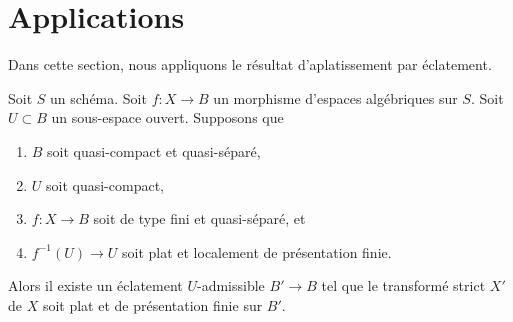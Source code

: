 \section{Applications}
\label{section-applications-flattening-by-blowing-up}

\noindent
Dans cette section, nous appliquons le résultat d'aplatissement par éclatement.

\begin{lemma}
\label{lemma-flat-after-blowing-up}
Soit $S$ un schéma. Soit $f : X \to B$ un morphisme d'espaces
algébriques sur $S$. Soit $U \subset B$ un sous-espace ouvert. Supposons que
\begin{enumerate}
\item $B$ soit quasi-compact et quasi-séparé,
\item $U$ soit quasi-compact,
\item $f : X \to B$ soit de type fini et quasi-séparé, et
\item $f^{-1}(U) \to U$ soit plat et localement de présentation finie.
\end{enumerate}
Alors il existe un éclatement $U$-admissible $B' \to B$ tel que
le transformé strict $X'$ de $X$ soit plat et de présentation finie
sur $B'$.
\end{lemma}

